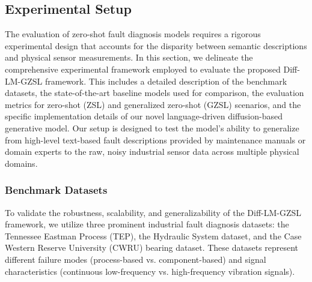 \subsection{Experimental Setup}
\label{sec:setup}
The evaluation of zero-shot fault diagnosis models requires a rigorous experimental design that accounts for the disparity between semantic descriptions and physical sensor measurements. In this section, we delineate the comprehensive experimental framework employed to evaluate the proposed Diff-LM-GZSL framework. This includes a detailed description of the benchmark datasets, the state-of-the-art baseline models used for comparison, the evaluation metrics for zero-shot (ZSL) and generalized zero-shot (GZSL) scenarios, and the specific implementation details of our novel language-driven diffusion-based generative model. Our setup is designed to test the model's ability to generalize from high-level text-based fault descriptions provided by maintenance manuals or domain experts to the raw, noisy industrial sensor data across multiple physical domains.

\subsubsection{Benchmark Datasets}
To validate the robustness, scalability, and generalizability of the Diff-LM-GZSL framework, we utilize three prominent industrial fault diagnosis datasets: the Tennessee Eastman Process (TEP), the Hydraulic System dataset, and the Case Western Reserve University (CWRU) bearing dataset. These datasets represent different failure modes (process-based vs. component-based) and signal characteristics (continuous low-frequency vs. high-frequency vibration signals).

